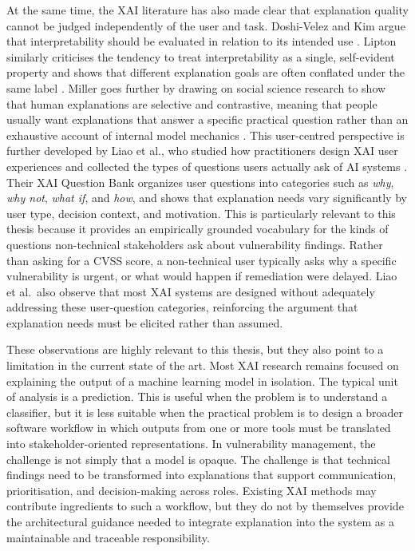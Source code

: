 At the same time, the XAI literature has also made clear that explanation quality cannot be judged independently of the user and task. Doshi-Velez and Kim argue that interpretability should be evaluated in relation to its intended use \cite{doshivelez2017rigorous}. Lipton similarly criticises the tendency to treat interpretability as a single, self-evident property and shows that different explanation goals are often conflated under the same label \cite{lipton2018mythos}. Miller goes further by drawing on social science research to show that human explanations are selective and contrastive, meaning that people usually want explanations that answer a specific practical question rather than an exhaustive account of internal model mechanics \cite{miller2019explanation}. This user-centred perspective is further developed by Liao et al., who studied how practitioners design XAI user experiences and collected the types of questions users actually ask of AI systems \cite{liao2020questioning}. Their XAI Question Bank organizes user questions into categories such as \textit{why}, \textit{why not}, \textit{what if}, and \textit{how}, and shows that explanation needs vary significantly by user type, decision context, and motivation. This is particularly relevant to this thesis because it provides an empirically grounded vocabulary for the kinds of questions non-technical stakeholders ask about vulnerability findings. Rather than asking for a CVSS score, a non-technical user typically asks why a specific vulnerability is urgent, or what would happen if remediation were delayed. Liao et al.\ also observe that most XAI systems are designed without adequately addressing these user-question categories, reinforcing the argument that explanation needs must be elicited rather than assumed.

These observations are highly relevant to this thesis, but they also point to a limitation in the current state of the art. Most XAI research remains focused on explaining the output of a machine learning model in isolation. The typical unit of analysis is a prediction. This is useful when the problem is to understand a classifier, but it is less suitable when the practical problem is to design a broader software workflow in which outputs from one or more tools must be translated into stakeholder-oriented representations. In vulnerability management, the challenge is not simply that a model is opaque. The challenge is that technical findings need to be transformed into explanations that support communication, prioritisation, and decision-making across roles. Existing XAI methods may contribute ingredients to such a workflow, but they do not by themselves provide the architectural guidance needed to integrate explanation into the system as a maintainable and traceable responsibility.

